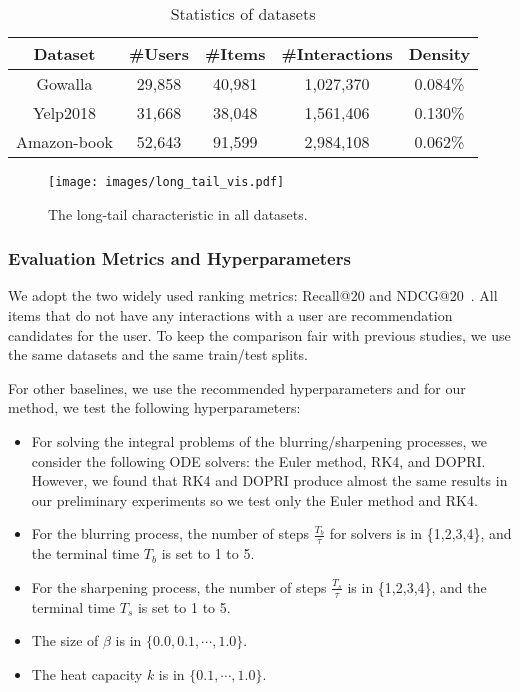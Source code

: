 \documentclass[sigconf,natbib=true]{acmart}
\begin{document}
\begin{table}[t]
    \small
    \centering
    \caption{Statistics of datasets}\label{tbl:data}
    \begin{tabular}{ccccc}\toprule
        Dataset     & \#Users & \#Items & \#Interactions & Density \\ \midrule
        Gowalla     & 29,858  & 40,981  & 1,027,370      & 0.084\% \\
        Yelp2018    & 31,668  & 38,048  & 1,561,406      & 0.130\% \\
        Amazon-book & 52,643  & 91,599  & 2,984,108      & 0.062\% \\
        \bottomrule
    \end{tabular}
\end{table}

\begin{figure}[t]
    \centering
\texttt{[image: images/long\_tail\_vis.pdf]}
    \caption{The long-tail characteristic in all datasets.}\label{fig:longtail}
\end{figure}


\subsubsection{Evaluation Metrics and Hyperparameters}
We adopt the two widely used ranking metrics: Recall@20 and NDCG@20~\cite{Jarvelin2002NDCG}. All items that do not have any interactions with a user are recommendation candidates for the user. To keep the comparison fair with previous studies, we use the same datasets and the same train/test splits.

For other baselines, we use the recommended hyperparameters and for our method, we test the following hyperparameters:
\begin{itemize}
    \item For solving the integral problems of the blurring/sharpening processes, we consider the following ODE solvers: the Euler method, RK4, and DOPRI. However, we found that RK4 and DOPRI produce almost the same results in our preliminary experiments so we test only the Euler method and RK4.
    \item For the blurring process, the number of steps $\frac{T_b}{\tau}$ for solvers is in \{1,2,3,4\}, and the terminal time $T_b$ is set to 1 to 5. 
    \item For the sharpening process, the number of steps $\frac{T_s}{\tau}$ is in \{1,2,3,4\}, and the terminal time $T_s$ is set to 1 to 5.
    \item The size of $\beta$ is in $\{0.0,0.1,\cdots,1.0\}$.
    \item The heat capacity $k$ is in $\{0.1,\cdots,1.0\}$.
\end{itemize}
\end{document}
